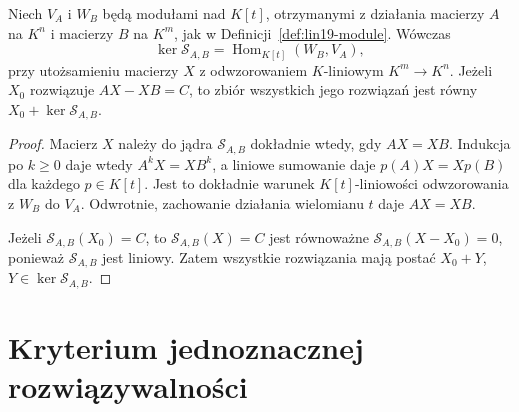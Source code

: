 \begin{stwierdzenie}
\label{prop:lin22-hom}
Niech \(V_A\) i \(W_B\) będą
modułami nad \(K[t]\), otrzymanymi
z działania macierzy \(A\) na \(K^n\)
i macierzy \(B\) na \(K^m\),
jak w Definicji~\ref{def:lin19-module}.
Wówczas
\[
 \ker\mathcal S_{A,B}
 =\operatorname{Hom}_{K[t]}(W_B,V_A),
\]
przy utożsamieniu macierzy \(X\)
z odwzorowaniem \(K\)-liniowym
\(K^m\to K^n\).
Jeżeli \(X_0\) rozwiązuje
\(AX-XB=C\), to zbiór wszystkich
jego rozwiązań jest równy
\(X_0+\ker\mathcal S_{A,B}\).
\end{stwierdzenie}
\begin{proof}
Macierz \(X\) należy do jądra
\(\mathcal S_{A,B}\) dokładnie wtedy,
gdy \(AX=XB\).
Indukcja po \(k\ge0\) daje wtedy
\(A^kX=XB^k\), a liniowe sumowanie
daje \(p(A)X=Xp(B)\)
dla każdego \(p\in K[t]\).
Jest to dokładnie warunek
\(K[t]\)-liniowości odwzorowania
z \(W_B\) do \(V_A\).
Odwrotnie, zachowanie działania
wielomianu \(t\) daje \(AX=XB\).

Jeżeli \(\mathcal S_{A,B}(X_0)=C\),
to \(\mathcal S_{A,B}(X)=C\)
jest równoważne
\(\mathcal S_{A,B}(X-X_0)=0\),
ponieważ \(\mathcal S_{A,B}\)
jest liniowy.
Zatem wszystkie rozwiązania
mają postać \(X_0+Y\),
\(Y\in\ker\mathcal S_{A,B}\).
\end{proof}

\section{Kryterium jednoznacznej rozwiązywalności}
\label{sec:lin22-criterion}

